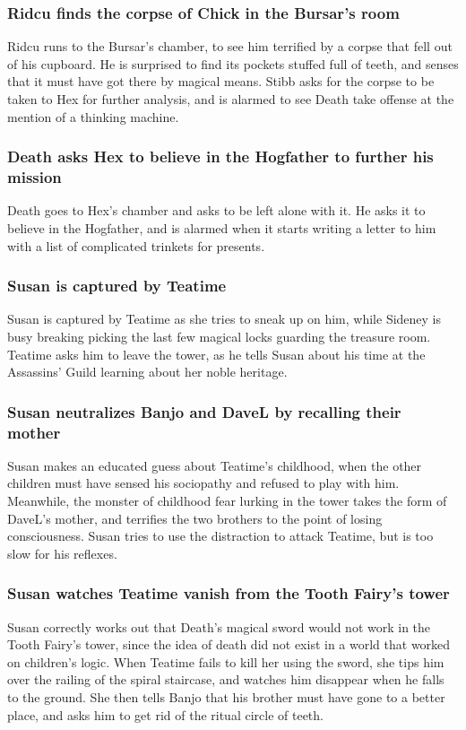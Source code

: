 \subsubsection{\Gls{Ridcu} finds the corpse of \Gls{Chick} in the \Gls{Bursar}'s room}
\Gls{Ridcu} runs to the \Gls{Bursar}'s chamber, to see him terrified by a corpse that fell out of
his cupboard. He is surprised to find its pockets stuffed full of teeth, and senses that it must
have got there by magical means. \Gls{Stibb} asks for the corpse to be taken to \Gls{Hex} for
further analysis, and is alarmed to see \Gls{Death} take offense at the mention of a thinking
machine.

\subsubsection{\Gls{Death} asks \Gls{Hex} to believe in the Hogfather to further his mission}
\Gls{Death} goes to \Gls{Hex}'s chamber and asks to be left alone with it. He asks it to believe in
the Hogfather, and is alarmed when it starts writing a letter to him with a list of complicated
trinkets for presents.

\subsubsection{\Gls{Susan} is captured by \Gls{Teatime}}
\Gls{Susan} is captured by \Gls{Teatime} as she tries to sneak up on him, while \Gls{Sideney} is
busy breaking picking the last few magical locks guarding the treasure room. \Gls{Teatime} asks him
to leave the tower, as he tells \Gls{Susan} about his time at the Assassins' Guild learning about
her noble heritage.

\subsubsection{\Gls{Susan} neutralizes \Gls{Banjo} and \Gls{DaveL} by recalling their mother}
\Gls{Susan} makes an educated guess about \Gls{Teatime}'s childhood, when the other children must
have sensed his sociopathy and refused to play with him. Meanwhile, the monster of childhood fear
lurking in the tower takes the form of \Gls{DaveL}'s mother, and terrifies the two brothers to the
point of losing consciousness. \Gls{Susan} tries to use the distraction to attack \Gls{Teatime},
but is too slow for his reflexes.

\subsubsection{\Gls{Susan} watches \Gls{Teatime} vanish from the Tooth Fairy's tower}
\Gls{Susan} correctly works out that \Gls{Death}'s magical sword would not work in the Tooth Fairy's
tower, since the idea of death did not exist in a world that worked on children's logic. When
\Gls{Teatime} fails to kill her using the sword, she tips him over the railing of the spiral
staircase, and watches him disappear when he falls to the ground. She then tells \Gls{Banjo} that
his brother must have gone to a better place, and asks him to get rid of the ritual circle of teeth.

